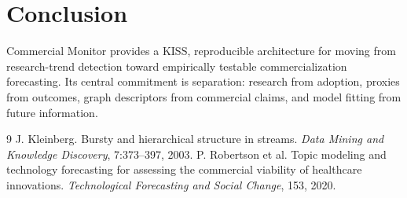\documentclass[11pt]{article}
\begin{document}
\section{Conclusion}
Commercial Monitor provides a KISS, reproducible architecture for moving from research-trend detection toward empirically testable commercialization forecasting. Its central commitment is separation: research from adoption, proxies from outcomes, graph descriptors from commercial claims, and model fitting from future information.
\begin{thebibliography}{9}
 J. Kleinberg. Bursty and hierarchical structure in streams. \emph{Data Mining and Knowledge Discovery}, 7:373--397, 2003.
 P. Robertson et al. Topic modeling and technology forecasting for assessing the commercial viability of healthcare innovations. \emph{Technological Forecasting and Social Change}, 153, 2020.
\end{thebibliography}
\end{document}
